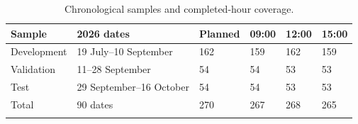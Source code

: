 \begin{table}[htbp]\centering
{\fontsize{9.8}{12}\selectfont\renewcommand{\arraystretch}{1.18}\setlength{\tabcolsep}{4pt}
\begin{tabularx}{\linewidth}{@{}L{27mm}L{55mm}C{18mm}C{18mm}C{18mm}X@{}}\toprule{}
\textbf{Sample} & \textbf{2026 dates} & \textbf{Planned} & \textbf{09:00} & \textbf{12:00} & \textbf{15:00} \\ \midrule
Development & 19 July--10 September & 162 & 159 & 162 & 159 \\ \hline
Validation & 11--28 September & 54 & 54 & 53 & 53 \\ \hline
Test & 29 September--16 October & 54 & 54 & 53 & 53 \\ \hline
Total & 90 dates & 270 & 267 & 268 & 265 \\ \hline
{}\bottomrule\end{tabularx}}
\caption[Chronological samples and completed-hour coverage]{Chronological samples and completed-hour coverage.}\label{tab:coverage}
\end{table}
